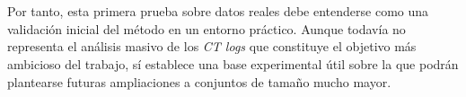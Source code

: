 \\
\\
Por tanto, esta primera prueba sobre datos reales debe entenderse como una validación inicial del método en un entorno práctico. Aunque todavía no representa el análisis masivo de los \textit{CT logs} que constituye el objetivo más ambicioso del trabajo, sí establece una base experimental útil sobre la que podrán plantearse futuras ampliaciones a conjuntos de tamaño mucho mayor.